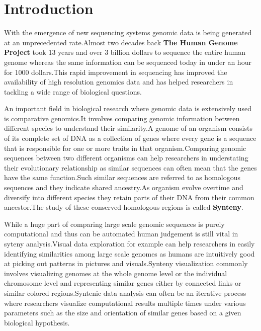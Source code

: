 \chapter{Introduction}

With the emergence of new sequencing systems genomic data is being generated at an unprecedented rate.Almost two decades back \textbf{The Human Genome Project} took 13 years and over 3 billion dollars to sequence the entire human genome whereas the same information can be sequenced today in under an hour for 1000 dollars.This rapid improvement in sequencing has improved the availability of high resolution genomics data and has helped researchers in tackling a wide range of biological questions.




An important field in biological research where genomic data is extensively used is comparative genomics.It involves comparing genomic information between different species to understand their similarity.A genome of an organism consists of its complete set of DNA as a collection of genes where every gene is a sequence that is responsible for one or more traits in that organism.Comparing genomic sequences between two different organisms can help researchers in understating their evolutionary relationship as similar sequences can often mean that the genes have the same function.Such similar sequences are referred to as homologous sequences and they indicate shared ancestry.As organism evolve overtime and diversify into different species they retain parts of their DNA from their common ancestor.The study of these conserved homologous regions is called \textbf{Synteny}. 

While a huge part of comparing large scale genomic sequences is purely computational and thus can be automated human judgement is still vital in syteny analysis.Visual data exploration for example can help researchers in easily identifying similarities among large scale genomes as humans are intuitively good at picking out patterns in pictures and visuals.Synteny visualization commonly involves visualizing genomes at the whole genome level or the individual chromosome level and representing similar genes either by connected links or similar colored regions.Syntenic data analysis can often be an iterative process where researchers visualize computational results multiple times under various parameters such as the size and orientation of similar genes based on a given biological hypothesis.

